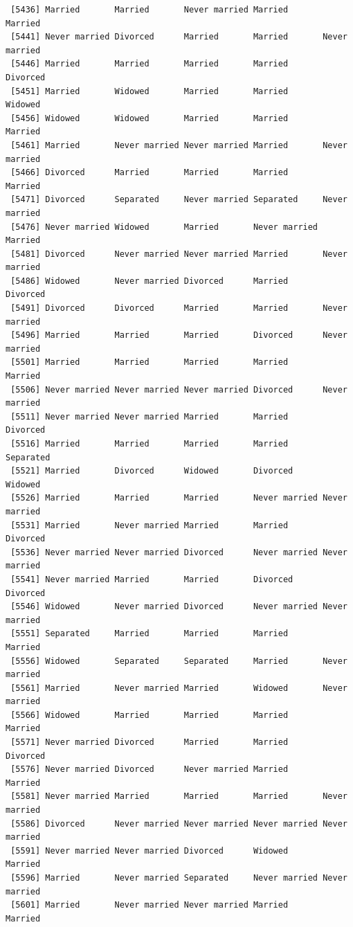 \documentclass[
  letterpaper,
  DIV=11,
  numbers=noendperiod,
  oneside]{scrartcl}
\begin{document}
\begin{verbatim}
 [5436] Married       Married       Never married Married       Married      
 [5441] Never married Divorced      Married       Married       Never married
 [5446] Married       Married       Married       Married       Divorced     
 [5451] Married       Widowed       Married       Married       Widowed      
 [5456] Widowed       Widowed       Married       Married       Married      
 [5461] Married       Never married Never married Married       Never married
 [5466] Divorced      Married       Married       Married       Married      
 [5471] Divorced      Separated     Never married Separated     Never married
 [5476] Never married Widowed       Married       Never married Married      
 [5481] Divorced      Never married Never married Married       Never married
 [5486] Widowed       Never married Divorced      Married       Divorced     
 [5491] Divorced      Divorced      Married       Married       Never married
 [5496] Married       Married       Married       Divorced      Never married
 [5501] Married       Married       Married       Married       Married      
 [5506] Never married Never married Never married Divorced      Never married
 [5511] Never married Never married Married       Married       Divorced     
 [5516] Married       Married       Married       Married       Separated    
 [5521] Married       Divorced      Widowed       Divorced      Widowed      
 [5526] Married       Married       Married       Never married Never married
 [5531] Married       Never married Married       Married       Divorced     
 [5536] Never married Never married Divorced      Never married Never married
 [5541] Never married Married       Married       Divorced      Divorced     
 [5546] Widowed       Never married Divorced      Never married Never married
 [5551] Separated     Married       Married       Married       Married      
 [5556] Widowed       Separated     Separated     Married       Never married
 [5561] Married       Never married Married       Widowed       Never married
 [5566] Widowed       Married       Married       Married       Married      
 [5571] Never married Divorced      Married       Married       Divorced     
 [5576] Never married Divorced      Never married Married       Married      
 [5581] Never married Married       Married       Married       Never married
 [5586] Divorced      Never married Never married Never married Never married
 [5591] Never married Never married Divorced      Widowed       Married      
 [5596] Married       Never married Separated     Never married Never married
 [5601] Married       Never married Never married Married       Married      

\end{verbatim}
\end{document}
